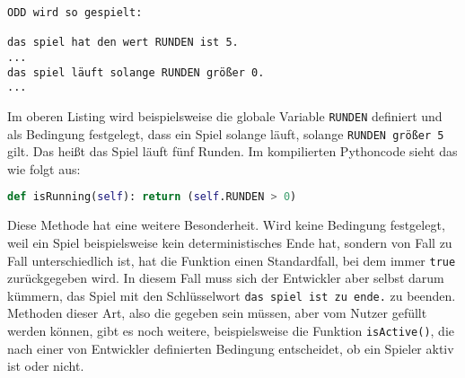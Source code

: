 \begin{lstlisting}[label={lst:ODD}]
ODD wird so gespielt:

das spiel hat den wert RUNDEN ist 5.
...
das spiel läuft solange RUNDEN größer 0.
...
\end{lstlisting}
	Im oberen Listing wird beispielsweise die globale Variable \texttt{RUNDEN} definiert und als Bedingung festgelegt, dass ein Spiel solange läuft, solange \texttt{RUNDEN größer 5} gilt. Das heißt das Spiel läuft fünf Runden. Im kompilierten Pythoncode sieht das wie folgt aus:
\begin{lstlisting}[language=Python]
def isRunning(self): return (self.RUNDEN > 0)
\end{lstlisting}
Diese Methode hat eine weitere Besonderheit. Wird keine Bedingung festgelegt, weil ein Spiel beispielsweise kein deterministisches Ende hat, sondern von Fall zu Fall unterschiedlich ist, hat die Funktion einen Standardfall, bei dem immer \texttt{true} zurückgegeben wird. In diesem Fall muss sich der Entwickler aber selbst darum kümmern, das Spiel mit den Schlüsselwort \texttt{das spiel ist zu ende.} zu beenden. Methoden dieser Art, also die gegeben sein müssen, aber vom Nutzer gefüllt werden können, gibt es noch weitere, beispielsweise die Funktion \texttt{isActive()}, die nach einer von Entwickler definierten Bedingung entscheidet, ob ein Spieler aktiv ist oder nicht.













